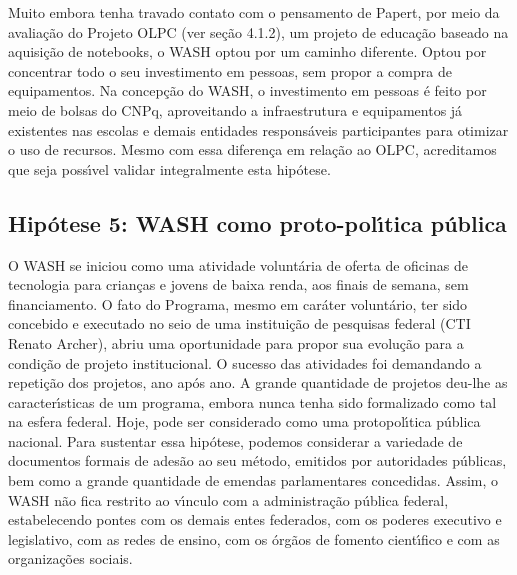 \documentclass[
12pt,		%
openright,	%
twoside,  %
a4paper,			%
chapter=TITLE,		%
english,			%
french,				%
spanish,			%
brazil				%
]{USPSC-classe/USPSC}
\begin{document}
Muito embora tenha travado contato com o pensamento de Papert, por meio da avalia\c{c}\~ao do Projeto OLPC (ver se\c{c}\~ao 4.1.2), um projeto de educa\c{c}\~ao baseado na aquisi\c{c}\~ao de notebooks, o WASH optou por um caminho diferente. Optou por concentrar todo o seu investimento em pessoas, sem propor a compra de equipamentos. Na concep\c{c}\~ao do WASH, o investimento em pessoas \'e feito por meio de bolsas do CNPq, aproveitando a infraestrutura e equipamentos j\'a existentes nas escolas e demais entidades respons\'aveis participantes para otimizar o uso de recursos.  Mesmo com essa diferen\c{c}a em rela\c{c}\~ao ao OLPC, acreditamos que seja poss\'{\i}vel validar integralmente esta hip\'otese.

















\subsection[Hip\'otese 5: WASH como proto-pol\'{\i}tica p\'ublica]{Hip\'otese 5: WASH como proto-pol\'{\i}tica p\'ublica}\label{Hip\'otese 5: WASH como proto-pol\'{\i}tica p\'ublica}
O WASH se iniciou como uma atividade volunt\'aria de oferta de oficinas de tecnologia para crian\c{c}as e jovens de baixa renda, aos finais de semana,  sem financiamento. O fato do Programa, mesmo em car\'ater volunt\'ario, ter sido concebido e executado no seio de uma institui\c{c}\~ao de pesquisas federal (CTI Renato Archer), abriu uma oportunidade para propor sua evolu\c{c}\~ao para a condi\c{c}\~ao de projeto institucional. O sucesso das atividades foi demandando a repeti\c{c}\~ao dos projetos, ano ap\'os ano. A grande quantidade de projetos deu-lhe as caracter\'{\i}sticas de um programa, embora nunca tenha sido formalizado como tal na esfera federal.  Hoje, pode ser considerado como uma protopol\'{\i}tica p\'ublica nacional. Para sustentar essa hip\'otese, podemos considerar a variedade de documentos formais de ades\~ao ao seu m\'etodo, emitidos por autoridades p\'ublicas, bem como a grande quantidade de emendas parlamentares concedidas. Assim, o WASH n\~ao fica restrito ao v\'{\i}nculo com a administra\c{c}\~ao p\'ublica federal, estabelecendo pontes com os demais entes federados, com os poderes executivo e legislativo, com as redes de ensino, com os \'org\~aos de fomento cient\'{\i}fico e com as organiza\c{c}\~oes sociais.
\end{document}
